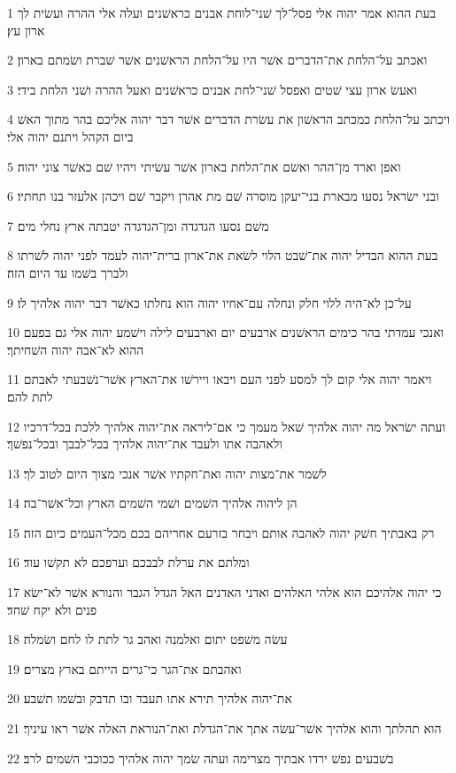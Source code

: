 \par 1 בעת ההוא אמר יהוה אלי פסל־לך שׁני־לוחת אבנים כראשׁנים ועלה אלי ההרה ועשׂית לך ארון עץ׃
\par 2 ואכתב על־הלחת את־הדברים אשׁר היו על־הלחת הראשׁנים אשׁר שׁברת ושׂמתם בארון׃
\par 3 ואעשׂ ארון עצי שׁטים ואפסל שׁני־לחת אבנים כראשׁנים ואעל ההרה ושׁני הלחת בידי׃
\par 4 ויכתב על־הלחת כמכתב הראשׁון את עשׂרת הדברים אשׁר דבר יהוה אליכם בהר מתוך האשׁ ביום הקהל ויתנם יהוה אלי׃
\par 5 ואפן וארד מן־ההר ואשׂם את־הלחת בארון אשׁר עשׂיתי ויהיו שׁם כאשׁר צוני יהוה׃
\par 6 ובני ישׂראל נסעו מבארת בני־יעקן מוסרה שׁם מת אהרן ויקבר שׁם ויכהן אלעזר בנו תחתיו׃
\par 7 משׁם נסעו הגדגדה ומן־הגדגדה יטבתה ארץ נחלי מים׃
\par 8 בעת ההוא הבדיל יהוה את־שׁבט הלוי לשׂאת את־ארון ברית־יהוה לעמד לפני יהוה לשׁרתו ולברך בשׁמו עד היום הזה׃
\par 9 על־כן לא־היה ללוי חלק ונחלה עם־אחיו יהוה הוא נחלתו כאשׁר דבר יהוה אלהיך לו׃
\par 10 ואנכי עמדתי בהר כימים הראשׁנים ארבעים יום וארבעים לילה וישׁמע יהוה אלי גם בפעם ההוא לא־אבה יהוה השׁחיתך׃
\par 11 ויאמר יהוה אלי קום לך למסע לפני העם ויבאו ויירשׁו את־הארץ אשׁר־נשׁבעתי לאבתם לתת להם׃
\par 12 ועתה ישׂראל מה יהוה אלהיך שׁאל מעמך כי אם־ליראה את־יהוה אלהיך ללכת בכל־דרכיו ולאהבה אתו ולעבד את־יהוה אלהיך בכל־לבבך ובכל־נפשׁך׃
\par 13 לשׁמר את־מצות יהוה ואת־חקתיו אשׁר אנכי מצוך היום לטוב לך׃
\par 14 הן ליהוה אלהיך השׁמים ושׁמי השׁמים הארץ וכל־אשׁר־בה׃
\par 15 רק באבתיך חשׁק יהוה לאהבה אותם ויבחר בזרעם אחריהם בכם מכל־העמים כיום הזה׃
\par 16 ומלתם את ערלת לבבכם וערפכם לא תקשׁו עוד׃
\par 17 כי יהוה אלהיכם הוא אלהי האלהים ואדני האדנים האל הגדל הגבר והנורא אשׁר לא־ישׂא פנים ולא יקח שׁחד׃
\par 18 עשׂה משׁפט יתום ואלמנה ואהב גר לתת לו לחם ושׂמלה׃
\par 19 ואהבתם את־הגר כי־גרים הייתם בארץ מצרים׃
\par 20 את־יהוה אלהיך תירא אתו תעבד ובו תדבק ובשׁמו תשׁבע׃
\par 21 הוא תהלתך והוא אלהיך אשׁר־עשׂה אתך את־הגדלת ואת־הנוראת האלה אשׁר ראו עיניך׃
\par 22 בשׁבעים נפשׁ ירדו אבתיך מצרימה ועתה שׂמך יהוה אלהיך ככוכבי השׁמים לרב׃

